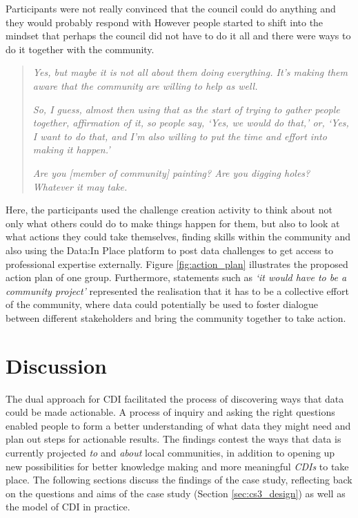 Participants were not really convinced that the council could do anything and they would probably respond with  However people started to shift into the mindset that perhaps the council did not have to do it all and there were ways to do it together with the community.
\begin{quote}
    \textit{Yes, but maybe it is not all about them doing everything. It's making them aware that the community are willing to help as well.}
    
    \textit{So, I guess, almost then using that as the start of trying to gather people together, affirmation of it, so people say, `Yes, we would do that,' or, `Yes, I want to do that, and I'm also willing to put the time and effort into making it happen.'}
    
    \textit{Are you [member of community] painting? Are you digging holes? Whatever it may take.}
\end{quote}
Here, the participants used the challenge creation activity to think about not only what others could do to make things happen for them, but also to look at what actions they could take themselves, finding skills within the community and also using the Data:In Place platform to post data challenges to get access to professional expertise externally. Figure \ref{fig:action_plan} illustrates the proposed action plan of one group. Furthermore, statements such as \textit{`it would have to be a community project'} represented the realisation that it has to be a collective effort of the community, where data could potentially be used to foster dialogue between different stakeholders and bring the community together to take action.

\section{Discussion}
The dual approach for CDI facilitated the process of discovering ways that data could be made actionable. A process of inquiry and asking the right questions enabled people to form a better understanding of what data they might need and plan out steps for actionable results. The findings contest the ways that data is currently projected \textit{to} and \textit{about} local communities, in addition to opening up new possibilities for better knowledge making and more meaningful \textit{CDIs} to take place. The following sections discuss the findings of the case study, reflecting back on the questions and aims of the case study (Section \ref{sec:cs3_design}) as well as the model of CDI in practice.

